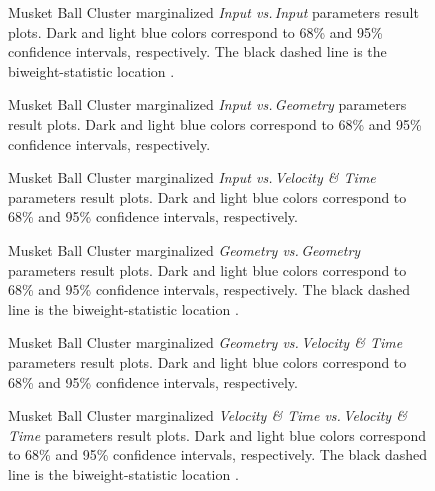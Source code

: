 \begin{figure}[b]
\caption{Musket Ball Cluster marginalized \emph{Input vs.\,Input} parameters result plots.  Dark and light blue colors correspond to 68\% and 95\% confidence intervals, respectively.  The black dashed line is the biweight-statistic location \citep{Beers:1982dp}.
\label{musket_inin}}
\end{figure}

\begin{figure}
\caption{Musket Ball Cluster marginalized \emph{Input vs.\,Geometry} parameters result plots.  Dark and light blue colors correspond to 68\% and 95\% confidence intervals, respectively.
\label{musket_ingeo}}
\end{figure}

\begin{figure}
\caption{Musket Ball Cluster marginalized \emph{Input vs.\,Velocity \& Time} parameters result plots.  Dark and light blue colors correspond to 68\% and 95\% confidence intervals, respectively.
\label{musket_invt}}
\end{figure}

\begin{figure}
\caption{Musket Ball Cluster marginalized \emph{Geometry vs.\,Geometry} parameters result plots.  Dark and light blue colors correspond to 68\% and 95\% confidence intervals, respectively.  The black dashed line is the biweight-statistic location \citep{Beers:1982dp}.
\label{musket_geogeo}}
\end{figure}

\begin{figure}
\caption{Musket Ball Cluster marginalized \emph{Geometry vs.\,Velocity \& Time} parameters result plots.  Dark and light blue colors correspond to 68\% and 95\% confidence intervals, respectively.
\label{musket_geovt}}
\end{figure}

\begin{figure}
\caption{Musket Ball Cluster marginalized \emph{Velocity \& Time vs.\,Velocity \& Time} parameters result plots.  Dark and light blue colors correspond to 68\% and 95\% confidence intervals, respectively.  The black dashed line is the biweight-statistic location \citep{Beers:1982dp}.
\label{musket_vtvt}}
\end{figure}